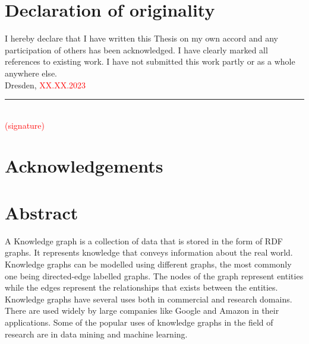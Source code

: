 \documentclass[12 pt, a4paper]{report}
\theoremstyle{definition}
\newcommand{\blankpage}{
\newpage
\thispagestyle{empty}
\addtocounter{page}{-1}
\mbox{}
\newpage
}
\begin{document}
\sloppy

\blankpage

\chapter*{Declaration of originality}
I hereby declare that I have written this Thesis on my own accord and any participation of others has been acknowledged. I have clearly marked all references to existing work. I have not submitted this work partly or as a whole anywhere else. \\

Dresden, \textcolor{red}{XX.XX.2023} \\
\rule{150 px}{0.5 px} \\
\textcolor{red}{(signature)}
\blankpage

\chapter*{Acknowledgements}
\textcolor{red}{\lipsum[1]}
\blankpage

%

\chapter*{Abstract}
A Knowledge graph is a collection of data that is stored in the form of RDF graphs. It represents knowledge that conveys information about the real world. Knowledge graphs can be modelled using different graphs, the most commonly one being directed-edge labelled graphs. The nodes of the graph represent entities while the edges represent the relationships that exists between the entities. Knowledge graphs have several uses both in commercial and research domains. There are used widely by large companies like Google and Amazon in their applications. Some of the popular uses of knowledge graphs in the field of research are in data mining and machine learning.
\end{document}
